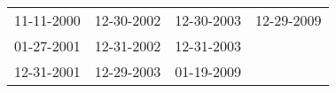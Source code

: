 \begin{supertabular}{llll}
 11-11-2000 &  12-30-2002 &  12-30-2003 &  12-29-2009 \\
 01-27-2001 &  12-31-2002 &  12-31-2003 &             \\
 12-31-2001 &  12-29-2003 &  01-19-2009 &             \\
\end{supertabular}
